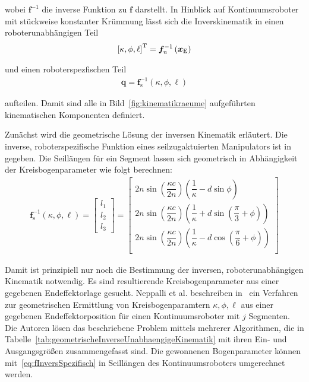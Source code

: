 wobei $\bm{f}^{-1}$ die inverse Funktion zu $\bm{f}$ darstellt. In Hinblick auf Kontinuumsroboter mit stückweise konstanter Krümmung lässt sich die Inverskinematik in einen roboterunabhängigen Teil
\begin{align}
\left[ \kappa, \phi, \ell \right]^{\mathrm{T}} = \bm{f}^{-1}_{\mathrm{u}} \left( \bm{x}_{\mathrm{E}} \right)
\end{align}

und einen roboterspezfischen Teil
\begin{align}
\bm{q} = \bm{f}^{-1}_{\mathrm{s}} \left( \kappa, \phi, \ell \right)
\end{align}

aufteilen. Damit sind alle in Bild~\ref{fig:kinematikraeume} aufgeführten kinematischen Komponenten definiert. \newline

Zunächst wird die geometrische Lösung der inversen Kinematik erläutert.
Die inverse, roboterspezifische Funktion eines seilzugaktuierten Manipulators ist in~\cite{JW06} gegeben. Die Seillängen für ein Segment lassen sich geometrisch in Abhängigkeit der Kreisbogenparameter wie folgt berechnen:
\begin{align}
\bm{f}^{-1}_{\mathrm{s}} \left( \kappa, \phi, \ell \right) = 
\begin{bmatrix}
l_1 \\ 
l_2 \\
l_3 
\end{bmatrix}
=
\begin{bmatrix}
2n \sin \left( \dfrac{\kappa c}{2n} \right) \left( \dfrac{1}{\kappa} - d \sin\phi \right) \\
2n \sin \left( \dfrac{\kappa c}{2n} \right) \left( \dfrac{1}{\kappa} + d \sin \left(\dfrac{\pi}{3} + \phi  \right) \right) \\
2n \sin \left( \dfrac{\kappa c}{2n} \right) \left( \dfrac{1}{\kappa} - d \cos \left(\dfrac{\pi}{6} + \phi  \right) \right) \\
\end{bmatrix}
\label{eq:fInversSpezifisch}
\end{align}

Damit ist prinzipiell nur noch die Bestimmung der inversen, roboterunabhängigen Kinematik notwendig. Es sind resultierende Kreisbogenparameter aus einer gegebenen Endeffektorlage gesucht. Neppalli et al. beschreiben in~\cite{NCJW09} ein Verfahren zur geometrischen Ermittlung von Kreisbogenparamtern $\kappa, \phi, \ell$ aus einer gegebenen Endeffektorposition für einen Kontinuumsroboter mit $j$ Segmenten. Die Autoren lösen das beschriebene Problem mittels mehrerer Algorithmen, die in Tabelle~\ref{tab:geometrischeInverseUnabhaengigeKinematik} mit ihren Ein- und Ausgangsgrößen zusammengefasst sind. Die gewonnenen Bogenparameter können mit~\eqref{eq:fInversSpezifisch} in Seillängen des Kontinuumsroboters umgerechnet werden. 

